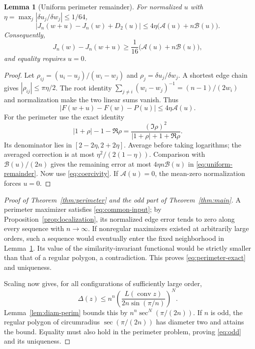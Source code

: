 \documentclass[11pt,reqno]{amsart}
\numberwithin{equation}{section}
\newtheorem{lemma}[theorem]{Lemma}
\theoremstyle{definition}
\theoremstyle{remark}
\newcommand{\A}{\mathcal A}
\newcommand{\B}{\mathcal B}
\newcommand{\dd}{\delta}
\DeclareMathOperator{\conv}{conv}
\begin{document}
\begin{lemma}[Uniform perimeter remainder]\label{lem:local-stability}
For normalized $u$ with $\eta=\max_j|\dd u_j/\dd w_j|\le1/64$,
\begin{equation}\label{eq:uniform-remainder}
 |J_n(w+u)-J_n(w)+D_2(u)|\le4\eta\bigl(\A(u)+n\B(u)\bigr).
\end{equation}
Consequently,
\begin{equation}\label{eq:local-stability}
 J_n(w)-J_n(w+u)\ge\frac1{16}\bigl(\A(u)+n\B(u)\bigr),
\end{equation}
and equality requires $u=0$.
\end{lemma}
\begin{proof}
Let $\rho_{ij}=(u_i-u_j)/(w_i-w_j)$ and $\rho_j=\dd u_j/\dd w_j$. A shortest edge chain gives $|\rho_{ij}|\le\pi\eta/2$. The root identity
$\sum_{j\ne i}(w_i-w_j)^{-1}=(n-1)/(2w_i)$ and normalization make the two linear sums vanish. Thus
\[
 |F(w+u)-F(w)-P(u)|\le4\eta\A(u).
\]
For the perimeter use the exact identity
\[
 |1+\rho|-1-\Re\rho
 =\frac{(\Im\rho)^2}{|1+\rho|+1+\Re\rho}.
\]
Its denominator lies in $[2-2\eta,2+2\eta]$. Average before taking logarithms; the averaged correction is at most $\eta^2/(2(1-\eta))$. Comparison with $\B(u)/(2n)$ gives the remaining error at most $4\eta n\B(u)$ in \eqref{eq:uniform-remainder}. Now use \eqref{eq:coercivity}. If $\A(u)=0$, the mean-zero normalization forces $u=0$.
\end{proof}

\begin{proof}[Proof of Theorem~\ref{thm:perimeter} and the odd part of Theorem~\ref{thm:main}]
A perimeter maximizer satisfies \eqref{eq:common-input}; by Proposition~\ref{prop:localization}, its normalized edge error tends to zero along every sequence with $n\to\infty$. If nonregular maximizers existed at arbitrarily large orders, such a sequence would eventually enter the fixed neighborhood in Lemma~\ref{lem:local-stability}. Its value of the similarity-invariant functional would be strictly smaller than that of a regular polygon, a contradiction. This proves \eqref{eq:perimeter-exact} and uniqueness.

Scaling now gives, for all configurations of sufficiently large order,
\[
 \Delta(z)\le n^n\left(\frac{L(\conv z)}{2n\sin(\pi/n)}\right)^N.
\]
Lemma~\ref{lem:diam-perim} bounds this by $n^n\sec^N(\pi/(2n))$. If $n$ is odd, the regular polygon of circumradius $\sec(\pi/(2n))$ has diameter two and attains the bound. Equality must also hold in the perimeter problem, proving \eqref{eq:odd} and its uniqueness.
\end{proof}
\end{document}
